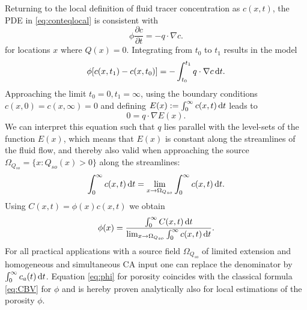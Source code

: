 \documentclass[paper=a4, fontsize=11pt,parskip=half,headings=small]{scrartcl}
\begin{document}
	Returning to the local definition of fluid tracer concentration as $c(x,t)$, the PDE in \eqref{eq:conteqlocal} is consistent with
	\begin{equation}
		\phi\frac{\partial c}{\partial t}  = - q \cdot \nabla c.
		\label{eq:1cmodel}
	\end{equation}
	for locations $x$ where $Q(x) = 0$.
	Integrating from $t_0$ to $t_1$ results in the model
	\begin{equation}
		\phi [c(x,t_1) - c(x,t_0)]  = - \int_{t_0}^{t_1}q \cdot  \nabla c \,\mathrm{d} t.
	\end{equation}
	Approaching the limit $t_0 = 0, t_1 = \infty$, using the boundary conditions $c(x,0) = c(x,\infty) = 0$ and defining $E(x):= \int_0^\infty c(x,t) \,\mathrm{d} t$ leads to
	\begin{equation}
		0 = q \cdot \nabla  E(x).
		\label{eq:streamlinezero}
	\end{equation}
	We can interpret this equation such that $q$ lies parallel with the level-sets of the function $E(x)$, which means that $E(x)$ is constant along the streamlines of the fluid flow, and thereby also valid when approaching the source $\Omega_{Q_{so}} = \{x: Q_{so}(x) > 0\}$ along the streamlines:
	\begin{equation}
		\int_0^\infty c(x,t) \,\mathrm{d} t = \lim_{x \rightarrow \Omega_{Q_{so}}}\int_0^\infty c(x,t) \,\mathrm{d} t.
	\end{equation}
	Using $C(x,t) = \phi(x) c(x,t)$ we obtain
	\begin{equation}
		\phi(x) =  \frac{ \int_{0}^{\infty} C(x,t) \,\mathrm{d} t }{\lim_{x \rightarrow \Omega_{Q_{so}}} \int_{0}^{\infty} c(x,t) \,\mathrm{d} t}.
		\label{eq:phi}
	\end{equation}
	For all practical applications with a source field $\Omega_{Q_{so}}$ of limited extension and homogeneous and simultaneous CA input one can replace the denominator by $\int_0^\infty c_a(t) \,\mathrm{d} t$.
	Equation \eqref{eq:phi} for porosity coincides with the classical formula \eqref{eq:CBV} for $\phi$ and is hereby proven analytically also for local estimations of the porosity $\phi$.
	
	
	
	

	
\end{document}
